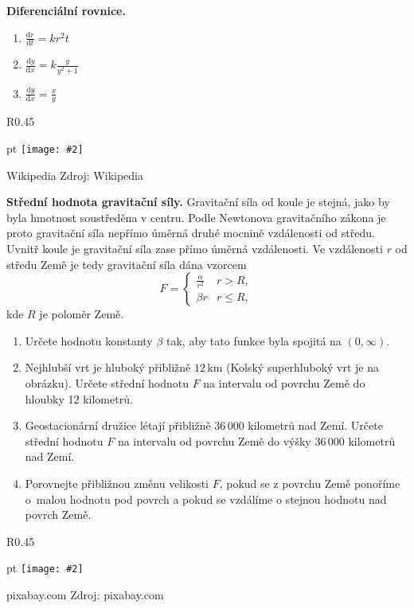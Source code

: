 \documentclass{article}
\def\zlomek{0.45}
\def\nic{}
\newcommand\obrazek[2][pixabay.com]{
  \clearpage
  \def\test{#1}
\begin{wrapfigure}{R}{\zlomek\linewidth}
  \begin{minipage}{1.0\linewidth}\parskip 0 pt
  \texttt{[image: \#2]}

  \vspace*{-10pt}
  \ifx\test\nic\else
  \null\hfill{\color{gray}\footnotesize Zdroj: #1}
  \fi

  \mezera
  \end{minipage}
\end{wrapfigure}
}
\let\oldtextbf\textbf
\def\textbf#1{%
  \oldtextbf{\color{red} #1}}
\def\mezera{\vspace*{10pt}}
\begin{document}
\newpage


\textbf{Diferenciální rovnice.}

\begin{enumerate}[1)]
   pt
\item $\frac{\mathrm dr}{\mathrm dt}=kr^2t$
\item $\frac{\mathrm dy}{\mathrm dx}=k\frac{y}{y^2+1}$
\item $\frac{\mathrm dy}{\mathrm dx}=\frac x{y}$

\end{enumerate}


\def\mezera{\vspace*{-20pt}}


\obrazek[Wikipedia]{vrt.jpg}

\textbf{Střední hodnota gravitační síly.}
Gravitační síla od koule je stejná, jako by byla hmotnost soustředěna
v centru. Podle Newtonova gravitačního zákona je proto gravitační síla
nepřímo úměrná druhé mocnině vzdálenosti od středu.
Uvnitř koule je gravitační síla zase přímo úměrná vzdálenosti. Ve vzdálenosti $r$ od středu Země je tedy gravitační síla dána vzorcem
$$F=
\begin{cases}
    \frac{\alpha}{r^2} & r>R,\\
  \beta r & r\leq R,
\end{cases}
$$
kde $R$ je poloměr Země.

\vspace*{-10pt}
\begin{enumerate} pt
\item Určete hodnotu konstanty $\beta$ tak, aby tato funkce byla
  spojitá na $(0,\infty)$. 
\item Nejhlubší vrt je hluboký přibližně $12\,\mathrm{km}$ (Kolský superhluboký vrt je na obrázku). Určete
střední hodnotu $F$ na intervalu od povrchu Země do hloubky
12 kilometrů.  
\item Geostacionární družice létají přibližně 36\,000 kilometrů nad
Zemí. Určete střední hodnotu $F$ na intervalu od povrchu
Země do výšky 36\,000 kilometrů nad Zemí.
\item Porovnejte přibližnou změnu velikosti $F$, pokud se z povrchu
Země ponoříme o~malou hodnotu pod povrch a pokud se vzdálíme o stejnou
hodnotu nad povrch Země.
\end{enumerate}

\newpage

\def\mezera{\vspace*{-20pt}}


\obrazek{horizont.jpg}
\end{document}
